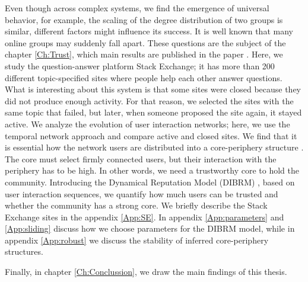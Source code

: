 Even though across complex systems, we find the emergence of universal behavior, for example, the scaling of the degree distribution of two groups is similar, different factors might influence its success. It is well known that many online groups may suddenly fall apart. These questions are the subject of the chapter \ref{Ch:Trust}, which main results are published in the paper \cite{vranic2022sustainability}. Here, we study the question-answer platform Stack Exchange; it has more than 200 different topic-specified sites where people help each other answer questions. What is interesting about this system is that some sites were closed because they did not produce enough activity. For that reason, we selected the sites with the same topic that failed, but later, when someone proposed the site again, it stayed active. We analyze the evolution of user interaction networks; here, we use the temporal network approach and compare active and closed sites. We find that it is essential how the network users are distributed into a core-periphery structure \cite{gallagher2020clarified}. The core must select firmly connected users, but their interaction with the periphery has to be high. In other words, we need a trustworthy core to hold the community. Introducing the Dynamical Reputation Model (DIBRM) \cite{melnikov2018toward}, based on user interaction sequences, we quantify how much users can be trusted and whether the community has a strong core. We briefly describe the Stack Exchange sites in the appendix \ref{App:SE}. In appendix \ref{App:parameters} and \ref{App:sliding} discuss how we choose parameters for the DIBRM model, while in appendix \ref{App:robust} we discuss the stability of inferred core-periphery structures. 

Finally, in chapter \ref{Ch:Conclussion}, we draw the main findings of this thesis. 















